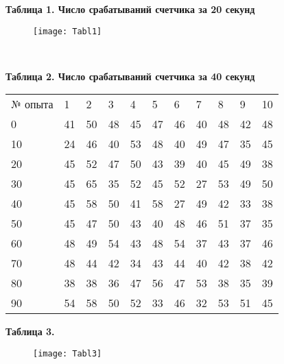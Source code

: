 \documentclass[a4paper, 12pt]{article} %
\begin{document}
\newpage

\* \textbf{Таблица 1. Число срабатываний счетчика за 20 секунд}
\begin{figure}[h]
\centering
\texttt{[image: Tabl1]}
\label{fig:mpr}
\end{figure}

\  

\* \textbf{Таблица 2. Число срабатываний счетчика за 40 секунд}

\begin{tabular}{lllllllllll}
\rowcolor[HTML]{9B9B9B} 
№ опыта                      & 1  & 2  & 3                       & 4                       & 5  & 6  & 7  & 8  & 9  & 10 \\
\cellcolor[HTML]{C0C0C0}0  & 41 & 50 & 48 & 45                      & 47 & 46 & 40 & 48 & 42 & 48 \\
\cellcolor[HTML]{C0C0C0}10 & 24 & 46 & 40& 53  & 48 & 40 & 49 & 47 & 35 & 45 \\ 
\cellcolor[HTML]{C0C0C0}20 & 45 & 52 & 47 & 50 & 43 & 39 & 40 & 45 & 49 & 38 \\ 
\cellcolor[HTML]{C0C0C0}30 & 45 & 65 & 35                      & 52                      & 45 & 52 & 27 & 53 & 49 & 50 \\
\cellcolor[HTML]{C0C0C0}40 & 45 & 58 & 50                      & 41                      & 58 & 27 & 49 & 42 & 33 & 38 \\
\cellcolor[HTML]{C0C0C0}50 & 45 & 47 & 50                      & 43                      & 40 & 48 & 46 & 51 & 37 & 35 \\
\cellcolor[HTML]{C0C0C0}60 & 48 & 49 & 54                      & 43                      & 48 & 54 & 37 & 43 & 37 & 46 \\
\cellcolor[HTML]{C0C0C0}70 & 48 & 44 & 42                      & 34                      & 43 & 44 & 40 & 42 & 38 & 42 \\
\cellcolor[HTML]{C0C0C0}80 & 38 & 38 & 36                      & 47                      & 56 & 47 & 53 & 38 & 35 & 39 \\
\cellcolor[HTML]{C0C0C0}90 & 54 & 58 & 50                      & 52                      & 33 & 46 & 32 & 53 & 51 & 45
\end{tabular}

\newpage

\* \textbf{Таблица 3.}
\begin{figure}[h]
\centering
\texttt{[image: Tabl3]}
\label{fig:mpr}
\end{figure}
\end{document}
